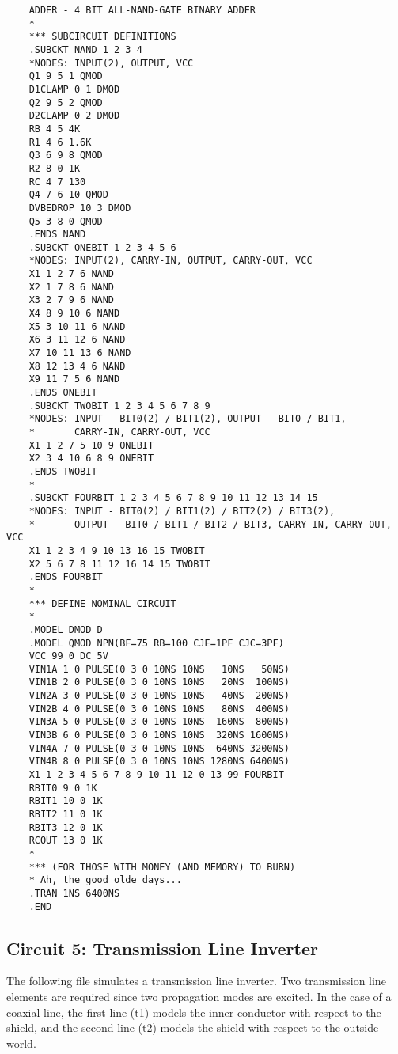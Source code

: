 \begin{verbatim}
    ADDER - 4 BIT ALL-NAND-GATE BINARY ADDER
    *
    *** SUBCIRCUIT DEFINITIONS
    .SUBCKT NAND 1 2 3 4
    *NODES: INPUT(2), OUTPUT, VCC
    Q1 9 5 1 QMOD
    D1CLAMP 0 1 DMOD
    Q2 9 5 2 QMOD
    D2CLAMP 0 2 DMOD
    RB 4 5 4K
    R1 4 6 1.6K
    Q3 6 9 8 QMOD
    R2 8 0 1K
    RC 4 7 130
    Q4 7 6 10 QMOD
    DVBEDROP 10 3 DMOD
    Q5 3 8 0 QMOD
    .ENDS NAND
    .SUBCKT ONEBIT 1 2 3 4 5 6
    *NODES: INPUT(2), CARRY-IN, OUTPUT, CARRY-OUT, VCC
    X1 1 2 7 6 NAND
    X2 1 7 8 6 NAND
    X3 2 7 9 6 NAND
    X4 8 9 10 6 NAND
    X5 3 10 11 6 NAND
    X6 3 11 12 6 NAND
    X7 10 11 13 6 NAND
    X8 12 13 4 6 NAND
    X9 11 7 5 6 NAND
    .ENDS ONEBIT
    .SUBCKT TWOBIT 1 2 3 4 5 6 7 8 9
    *NODES: INPUT - BIT0(2) / BIT1(2), OUTPUT - BIT0 / BIT1,
    *       CARRY-IN, CARRY-OUT, VCC
    X1 1 2 7 5 10 9 ONEBIT
    X2 3 4 10 6 8 9 ONEBIT
    .ENDS TWOBIT
    *
    .SUBCKT FOURBIT 1 2 3 4 5 6 7 8 9 10 11 12 13 14 15
    *NODES: INPUT - BIT0(2) / BIT1(2) / BIT2(2) / BIT3(2),
    *       OUTPUT - BIT0 / BIT1 / BIT2 / BIT3, CARRY-IN, CARRY-OUT, VCC
    X1 1 2 3 4 9 10 13 16 15 TWOBIT
    X2 5 6 7 8 11 12 16 14 15 TWOBIT
    .ENDS FOURBIT
    *
    *** DEFINE NOMINAL CIRCUIT
    *
    .MODEL DMOD D
    .MODEL QMOD NPN(BF=75 RB=100 CJE=1PF CJC=3PF)
    VCC 99 0 DC 5V
    VIN1A 1 0 PULSE(0 3 0 10NS 10NS   10NS   50NS)
    VIN1B 2 0 PULSE(0 3 0 10NS 10NS   20NS  100NS)
    VIN2A 3 0 PULSE(0 3 0 10NS 10NS   40NS  200NS)
    VIN2B 4 0 PULSE(0 3 0 10NS 10NS   80NS  400NS)
    VIN3A 5 0 PULSE(0 3 0 10NS 10NS  160NS  800NS)
    VIN3B 6 0 PULSE(0 3 0 10NS 10NS  320NS 1600NS)
    VIN4A 7 0 PULSE(0 3 0 10NS 10NS  640NS 3200NS)
    VIN4B 8 0 PULSE(0 3 0 10NS 10NS 1280NS 6400NS)
    X1 1 2 3 4 5 6 7 8 9 10 11 12 0 13 99 FOURBIT
    RBIT0 9 0 1K
    RBIT1 10 0 1K
    RBIT2 11 0 1K
    RBIT3 12 0 1K
    RCOUT 13 0 1K
    *
    *** (FOR THOSE WITH MONEY (AND MEMORY) TO BURN)
    * Ah, the good olde days...
    .TRAN 1NS 6400NS
    .END
\end{verbatim}

\subsection{Circuit 5:  Transmission Line Inverter}


The following file simulates a transmission line inverter.  Two
transmission line elements are required since two propagation modes
are excited.  In the case of a coaxial line, the first line (t1)
models the inner conductor with respect to the shield, and the second
line (t2) models the shield with respect to the outside world.

